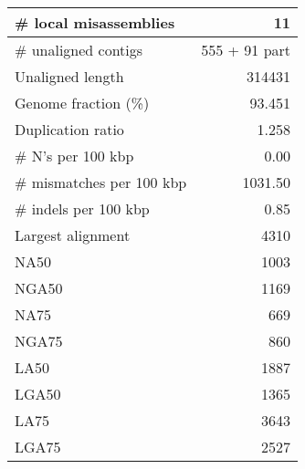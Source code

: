 \documentclass[12pt,a4paper]{article}
\begin{document}
\begin{table}[ht]
\begin{center}
\begin{tabular}{|l*{1}{|r}|}
\# local misassemblies & 11 \\ \hline
\# unaligned contigs & 555 + 91 part \\ \hline
Unaligned length & 314431 \\ \hline
Genome fraction (\%) & 93.451 \\ \hline
Duplication ratio & 1.258 \\ \hline
\# N's per 100 kbp & 0.00 \\ \hline
\# mismatches per 100 kbp & 1031.50 \\ \hline
\# indels per 100 kbp & 0.85 \\ \hline
Largest alignment & 4310 \\ \hline
NA50 & 1003 \\ \hline
NGA50 & 1169 \\ \hline
NA75 & 669 \\ \hline
NGA75 & 860 \\ \hline
LA50 & 1887 \\ \hline
LGA50 & 1365 \\ \hline
LA75 & 3643 \\ \hline
LGA75 & 2527 \\ \hline
\end{tabular}
\end{center}
\end{table}
\end{document}
